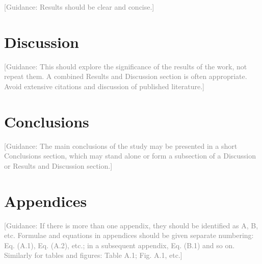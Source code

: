 \documentclass[review]{elsarticle}
\begin{document}
\textcolor{gray}{[Guidance: Results should be clear and concise.]}

\section{Discussion}

\textcolor{gray}{[Guidance: This should explore the significance of the results 
of the work, not repeat them. A combined Results and Discussion section is
often appropriate.  Avoid extensive citations and discussion of published
literature.]}

\section{Conclusions}

\textcolor{gray}{[Guidance: The main conclusions of the study may be presented 
in a short Conclusions section, which may stand alone or form a subsection of a
Discussion or Results and Discussion section.]}

\section*{Appendices}

\textcolor{gray}{[Guidance: If there is more than one appendix, they should 
be identified as A, B, etc.  Formulae and equations in appendices should be
given separate numbering: Eq.  (A.1), Eq. (A.2), etc.; in a subsequent
appendix, Eq. (B.1) and so on.  Similarly for tables and figures: Table A.1;
Fig. A.1, etc.]}
\end{document}
